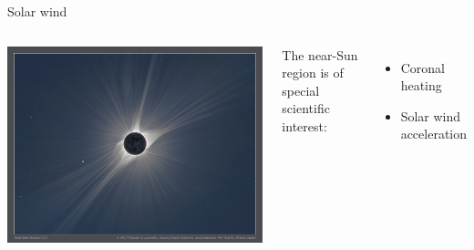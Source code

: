 \begin{frame}[plain,c]{Solar wind}{}
	\begin{columns}[c]
		
		\hspace*{-17pt}
		\includegraphics[width=\textwidth]{../talk_figures/TSE_2017_200mm_Whiskey_m-d.png}
		
		
		The near-Sun region is of special scientific interest:\\
		\begin{itemize}
			\item Coronal heating
			\item Solar wind acceleration
		\end{itemize}
		
	\end{columns}
\end{frame}
